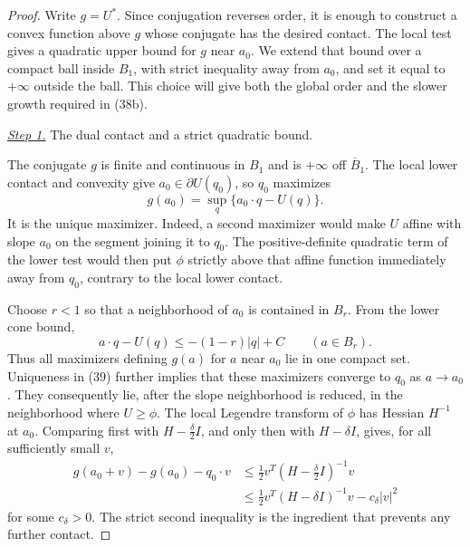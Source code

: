 \documentclass{aomart}
\theoremstyle{definition}
\newcommand{\1}{\mathbf 1}
\begin{document}
\begin{proof}
Write $g=U^*$.  Since conjugation reverses order, it is enough to
construct a convex function above $g$ whose conjugate has the desired
contact.  The local test gives a quadratic upper bound for $g$ near
$a_0$.  We extend that bound over a compact ball inside $B_1$, with
strict inequality away from $a_0$, and set it equal to $+\infty$
outside the ball.  This choice will give both the global order and
the slower growth required in (38b).

\smallskip\noindent
\underline{\textit{Step 1.}} The dual contact and a strict quadratic bound.

The conjugate $g$ is finite and continuous in $B_ 1$ and is
$+\infty$ off $\overline B_ 1$.  The local lower contact and
convexity give $a_ 0\in\partial U(q_ 0)$, so $q_ 0$ maximizes
\begin{equation}
g(a_ 0)=\sup_ q\{a_ 0\cdot q-U(q)\}.
\tag{39}
\end{equation}
It is the unique maximizer.  Indeed, a second maximizer would make
$U$ affine with slope $a_ 0$ on the segment joining it to $q_ 0$.
The positive-definite quadratic term of the lower test would then put
$\phi$ strictly above that affine function immediately away from
$q_ 0$, contrary to the local lower contact.

Choose $r<1$ so that a neighborhood of $a_ 0$ is contained in
$B_ r$.  From the lower cone bound,
\begin{equation}
a\cdot q-U(q)\leq-(1-r)|q|+C\qquad(a\in B_ r).
\tag{40}
\end{equation}
Thus all maximizers defining $g(a)$ for $a$ near $a_ 0$ lie in
one compact set.  Uniqueness in (39) further implies that these
maximizers converge to $q_ 0$ as $a\to a_ 0$.  They consequently
lie, after the slope neighborhood is reduced, in the neighborhood
where $U\geq\phi$.  The local Legendre transform of $\phi$ has
Hessian $H^{-1}$ at $a_ 0$.  Comparing first with
$H-\frac\delta2I$, and only then with $H-\delta I$, gives, for
all sufficiently small $v$,
\begin{equation}
\begin{split}
g(a_ 0+v)-g(a_ 0)-q_ 0\cdot v
&\leq\frac12v^T(H-\tfrac\delta2I)^{-1}v\\
&\leq\frac12v^T(H-\delta I)^{-1}v-c_ \delta|v|^2
\end{split}
\tag{41}
\end{equation}
for some $c_ \delta>0$.  The strict second inequality is the
ingredient that prevents any further contact.


\end{proof}
\end{document}
